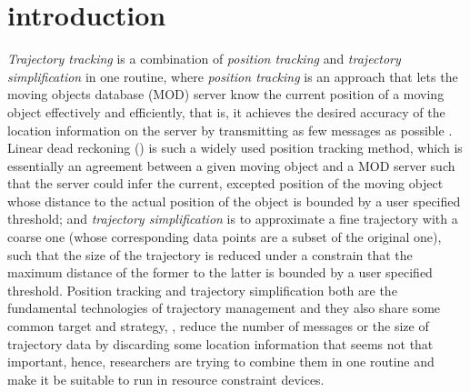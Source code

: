 

\section{introduction}
\label{sec-intro}


\textit{Trajectory tracking} \cite{Lange:Tracking} is a combination of \textit{position tracking} \cite{Wolfson:PositionTracking,Leonhardi:Comparison} and \textit{trajectory simplification} \cite{Lin:Cised,Zhang:Evaluation} in one routine, where \textit{position tracking} is an approach that lets the moving objects database (MOD) server know the current position of a moving object effectively and efficiently, that is, it achieves the desired accuracy of the location information on the server by transmitting as few messages as possible \cite{Leonhardi:Comparison}. Linear dead reckoning (\ldr) \cite{Wolfson:PositionTracking} is such a widely used position tracking method, which is essentially an agreement between a given moving object and a MOD server such that the server could infer the current, excepted position of the moving object whose distance to the actual position of the object is bounded by a user specified threshold;
%
and \textit{trajectory simplification} \cite{Lin:Cised,Zhang:Evaluation} is to approximate a fine trajectory with a coarse one (whose corresponding data points are a subset of the original one), such that the size of the trajectory is reduced under a constrain that the maximum distance of the former to the latter is bounded by a user specified threshold. 
%
Position tracking and trajectory simplification both are the fundamental technologies of trajectory management and they also share some common target and strategy, \ie, reduce the number of messages or the size of trajectory data by discarding some location information that seems not that important, hence, researchers are trying to combine them in one routine and make it be suitable to run in resource constraint devices.

